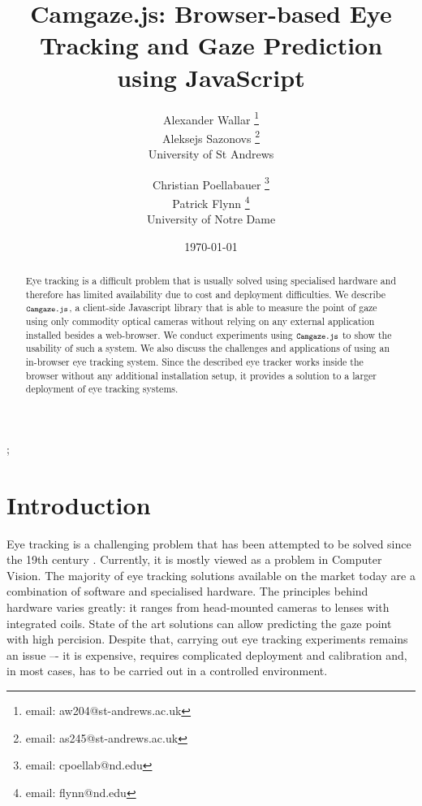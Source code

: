 \documentclass[annual]{acmsiggraph}
\title{Camgaze.js: Browser-based Eye Tracking and Gaze Prediction using
JavaScript}
\author{Alexander Wallar \thanks{email: aw204@st-andrews.ac.uk} \\ Aleksejs
Sazonovs \thanks{email: as245@st-andrews.ac.uk} \\ University of St Andrews
\and Christian Poellabauer \thanks{email: cpoellab@nd.edu} \\ Patrick Flynn
\thanks{email: flynn@nd.edu} \\ University of Notre Dame}
\date{\today}
\newcommand{\Acronym}[1]{\ensuremath{{\small{\texttt{#1}}}}}
\newcommand{\Name}{\Acronym{Camgaze.js}} \newcommand{\False}{\Constant{false}}
\newcommand{\Constant}[1]{\ensuremath{\small{\texttt{#1}}}}
\begin{document}
\maketitle

\begin{abstract}

Eye tracking is a difficult problem that is usually solved using specialised
hardware and therefore has limited availability due to cost and deployment
difficulties. We describe $\Name$, a client-side Javascript library that is
able to measure the point of gaze using only commodity optical cameras without
relying on any external application installed besides a web-browser. We conduct
experiments using $\Name$ to show the usability of such a system.  We also
discuss the challenges and applications of using an in-browser eye tracking
system. Since the described eye tracker works inside the browser without any
additional installation setup, it provides a solution to a larger deployment of
eye tracking systems.

\end{abstract}

\begin{CRcatlist} ;

\end{CRcatlist}

\keywordlist


\copyrightspace

\section{Introduction}

Eye tracking is a challenging problem that has been attempted to be solved
since the 19th century \cite{Ahrens1891}. Currently, it is mostly viewed as a
problem in Computer Vision. The majority of eye tracking solutions available on
the market today are a combination of software and specialised hardware. The
principles behind hardware varies greatly: it ranges from head-mounted cameras
to lenses with integrated coils. State of the art
solutions can allow predicting the gaze point with high percision. Despite that, carrying out eye
tracking experiments remains an issue –- it is expensive, requires complicated
deployment and calibration and, in most cases, has to be carried out in a
controlled environment.
\end{document}
